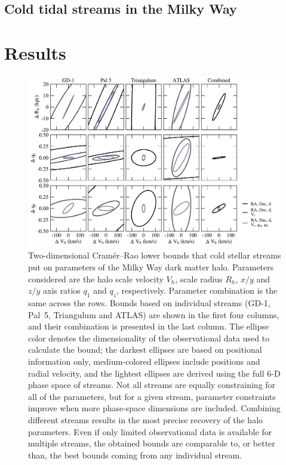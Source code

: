 \documentclass[modern]{aastex61}
\begin{document}
\subsection{Cold tidal streams in the Milky Way}


\section{Results}



\begin{figure}
\begin{center}
\includegraphics[width=\textwidth]{crlb_2d.pdf}
\caption{Two-dimensional Cram\' er--Rao lower bounds that cold stellar streams put on parameters of the Milky Way dark matter halo.
Parameters considered are the halo scale velocity $V_h$, scale radius $R_h$, $x/y$ and $z/y$ axis ratios $q_1$ and $q_z$, respectively.
Parameter combination is the same across the rows.
Bounds based on individual streams (GD-1, Pal~5, Triangulum and ATLAS) are shown in the first four columns, and their combination is presented in the last column.
The ellipse color denotes the dimensionality of the observational data used to calculate the bound; the darkest ellipses are based on positional information only, medium-colored ellipses include positions and radial velocity, and the lightest ellipses are derived using the full 6-D phase space of streams.
Not all streams are equally constraining for all of the parameters, but for a given stream, parameter constraints improve when more phase-space dimensions are included.
Combining different streams results in the most precise recovery of the halo parameters.
Even if only limited observational data is available for multiple streams, the obtained bounds are comparable to, or better than, the best bounds coming from any individual stream.
}
\label{fig:2dbounds}
\end{center}
\end{figure}
\end{document}
